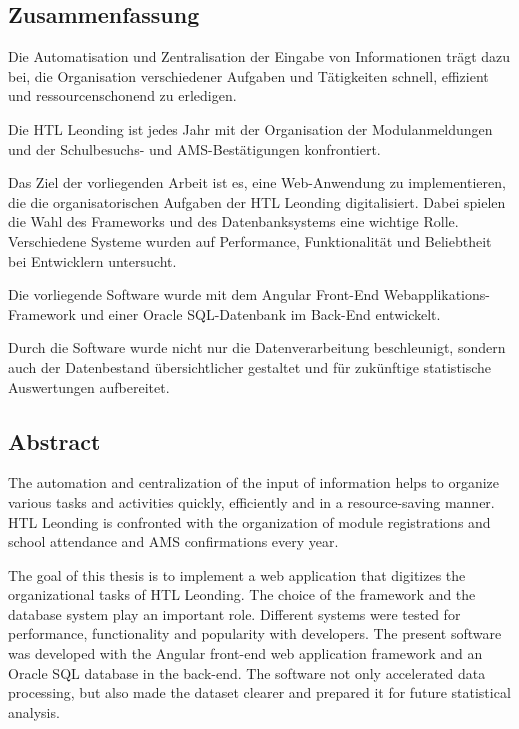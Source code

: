 \newpage
\begin{spacing}{1}
    \chapter*{Zusammenfassung}
\end{spacing}


Die Automatisation und Zentralisation der Eingabe von Informationen trägt dazu bei, die Organisation verschiedener Aufgaben und Tätigkeiten schnell,
effizient und ressourcenschonend zu erledigen. 

Die HTL Leonding ist jedes Jahr mit der Organisation der Modulanmeldungen und der Schulbesuchs- und AMS-Bestätigungen konfrontiert. 

Das Ziel der vorliegenden Arbeit ist es, eine Web-Anwendung zu implementieren, die die organisatorischen Aufgaben der HTL Leonding digitalisiert.
Dabei spielen die Wahl des Frameworks und des Datenbanksystems eine wichtige Rolle. Verschiedene Systeme wurden auf Performance, Funktionalität und Beliebtheit bei Entwicklern untersucht. 

Die vorliegende Software wurde mit dem Angular Front-End Webapplikations-Framework und einer Oracle SQL-Datenbank im Back-End entwickelt. 

Durch die Software wurde nicht nur die Datenverarbeitung beschleunigt, sondern auch der Datenbestand übersichtlicher gestaltet und für zukünftige statistische Auswertungen aufbereitet.


\begin{spacing}{1}
    \chapter*{Abstract}
\end{spacing}
The automation and centralization of the input of information helps to organize various tasks and activities quickly,
efficiently and in a resource-saving manner. 
HTL Leonding is confronted with the organization of module registrations and school attendance and AMS confirmations every year. 

The goal of this thesis is to implement a web application that digitizes the organizational tasks of HTL Leonding.
The choice of the framework and the database system play an important role. Different systems were tested for performance,
functionality and popularity with developers. 
The present software was developed with the Angular front-end web application framework and an Oracle SQL database in the back-end. 
The software not only accelerated data processing, but also made the dataset clearer and prepared it for future statistical analysis.



